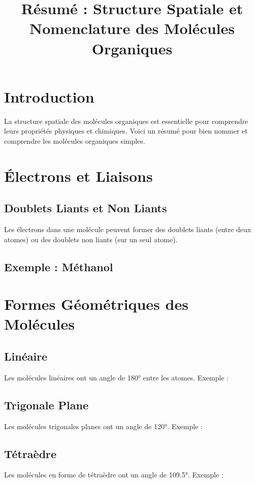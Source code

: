 \documentclass[12pt]{article}
\title{Résumé : Structure Spatiale et Nomenclature des Molécules Organiques}
\author{}
\date{}
\begin{document}
\maketitle

\section{Introduction}
La structure spatiale des molécules organiques est essentielle pour comprendre leurs propriétés physiques et chimiques. Voici un résumé pour bien nommer et comprendre les molécules organiques simples.

\section{Électrons et Liaisons}
\subsection{Doublets Liants et Non Liants}
Les électrons dans une molécule peuvent former des doublets liants (entre deux atomes) ou des doublets non liants (sur un seul atome).

\subsection{Exemple : Méthanol}

\section{Formes Géométriques des Molécules}
\subsection{Linéaire}
Les molécules linéaires ont un angle de 180° entre les atomes. Exemple : 

\subsection{Trigonale Plane}
Les molécules trigonales planes ont un angle de 120°. Exemple : 

\subsection{Tétraèdre}
Les molécules en forme de tétraèdre ont un angle de 109.5°. Exemple : 
\end{document}
